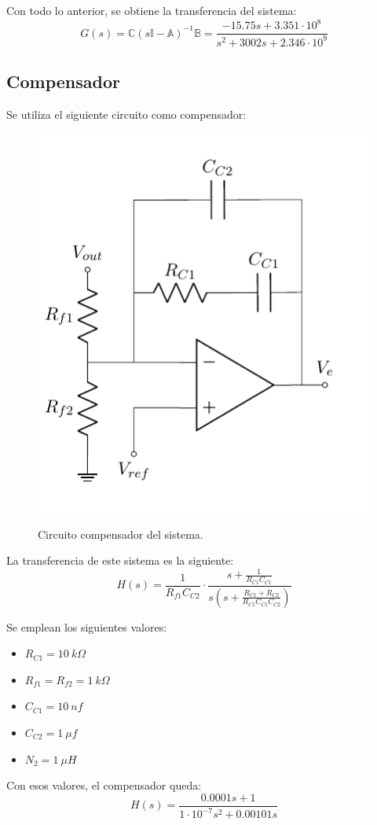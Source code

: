 Con todo lo anterior, se obtiene la transferencia del sistema:
\begin{equation}
	G(s) = \mathbb{C} \left(s \mathbb{I} - \mathbb{A} \right)^{-1} \mathbb{B} = \frac{-15.75 s + 3.351 \cdot 10^{8}}{s^2 + 3002s + 2.346 \cdot 10^{9}}
\end{equation}

\subsection{Compensador}

Se utiliza el siguiente circuito como compensador:
\begin{figure}[H]
	\centering
	\includegraphics[width=0.3\linewidth, page = 1]{ImagenesParteIII/CircuitsP3.pdf}
	\label{fig:compensador}
	\caption{Circuito compensador del sistema.}
\end{figure}

La transferencia de este sistema es la siguiente:
\begin{equation}
	H(s) = \frac{ 1 }{ R_{f1} C_{C2} } \cdot \frac{s + \frac{1}{ R_{C1} C_{C1}}}{ s \left( s + \frac{R_{C1} + R_{C2}}{R_{C1} C_{C1} C_{C2}} \right)}
\end{equation}

Se emplean los siguientes valores:
\begin{multicols}{2}
\begin{itemize}
	\item $R_{C1} = 10 \ k\Omega$
	\item $R_{f1} = R_{f2} = 1 \ k\Omega$
	\item $C_{C1} = 10 \ nf$
	\item $C_{C2} = 1 \ \mu f$
	\item $N_2 = 1 \ \mu H$
\end{itemize}
\end{multicols}

Con esos valores, el compensador queda:
\begin{equation}
	H(s) = \frac{0.0001 s + 1}{ 1 \cdot 10^{-7} s^2 + 0.00101 s }
\end{equation}

